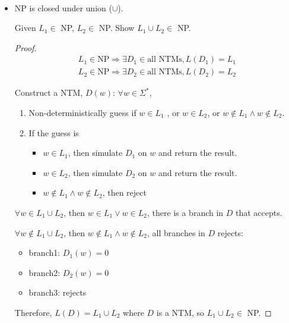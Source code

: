 \documentclass[twoside,11pt]{homework}
\begin{document}
\begin{solution}
  \ \\
  \begin{itemize}
  \item NP is closed under union ($\cup$).
    \begin{goal}
      Given $L_1 \in$ NP, $L_2 \in$ NP.
      Show $L_1 \cup L_2 \in$ NP.
    \end{goal}
    \begin{proof}
      \[
        \begin{aligned}
        L_1 \in \text{NP} \Rightarrow \exists D_1 \in \text{all NTMs}, L(D_1) = L_1\\
        L_2 \in \text{NP} \Rightarrow \exists D_2 \in \text{all NTMs}, L(D_2) = L_2
        \end{aligned}
      \]

      Construct a NTM, $D(w)$: $\forall w \in \Sigma^*$,
      \begin{enumerate}
      \item Non-deterministically guess if $w \in L_1$ , or $w \in L_2$, or $w \notin L_1
        \land w \notin L_2$.
      \item If the guess is
        \begin{itemize}
        \item $w \in L_1$, then
          simulate $D_1$ on $w$ and return the result.
        \item $w \in L_2$, then
          simulate $D_2$ on $w$ and return the result.
        \item $w \notin L_1 \land w \notin L_2$, then
          reject
        \end{itemize}
      \end{enumerate}

      $\forall w \in L_1 \cup L_2$, then $w \in L_1 \lor w \in L_2$, there is a branch
      in $D$ that accepts.

      $\forall w \notin L_1 \cup L_2$, then $w \notin L_1 \land w \notin L_2$, all branches in
      $D$ rejects:
      \begin{itemize}
      \item branch1: $D_1(w) = 0$
      \item branch2: $D_2(w) = 0$
      \item branch3: rejects
      \end{itemize}

      Therefore, $L(D) = L_1 \cup L_2$ where $D$ is a NTM, so $L_1 \cup L_2 \in$ NP.


\end{proof}
\end{itemize}
\end{solution}
\end{document}
